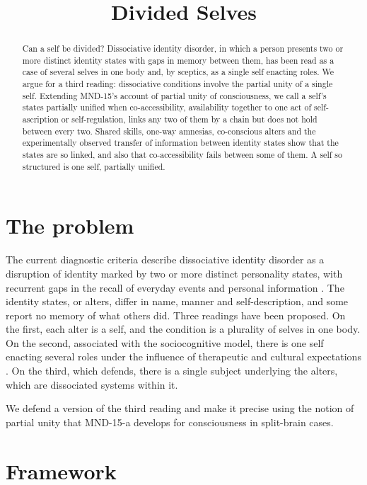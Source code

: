 \documentclass{situationist-preprint}
\title{Divided Selves}
\begin{document}
\maketitle

\begin{abstract}
Can a self be divided? Dissociative identity disorder, in which a person presents two or more distinct identity states with gaps in memory between them, has been read as a case of several selves in one body and, by sceptics, as a single self enacting roles. We argue for a third reading: dissociative conditions involve the partial unity of a single self. Extending MND-15's account of partial unity of consciousness, we call a self's states partially unified when co-accessibility, availability together to one act of self-ascription or self-regulation, links any two of them by a chain but does not hold between every two. Shared skills, one-way amnesias, co-conscious alters and the experimentally observed transfer of information between identity states show that the states are so linked, and also that co-accessibility fails between some of them. A self so structured is one self, partially unified.
\end{abstract}

\section{The problem}

The current diagnostic criteria describe dissociative identity disorder as a disruption of identity marked by two or more distinct personality states, with recurrent gaps in the recall of everyday events and personal information \citep{APA2013}. The identity states, or alters, differ in name, manner and self-description, and some report no memory of what others did. Three readings have been proposed. On the first, each alter is a self, and the condition is a plurality of selves in one body. On the second, associated with the sociocognitive model, there is one self enacting several roles under the influence of therapeutic and cultural expectations \citep{Spanos1994}. On the third, which \citet{Braude1995} defends, there is a single subject underlying the alters, which are dissociated systems within it.

We defend a version of the third reading and make it precise using the notion of partial unity that MND-15-a develops for consciousness in split-brain cases.

\section{Framework}
\end{document}
